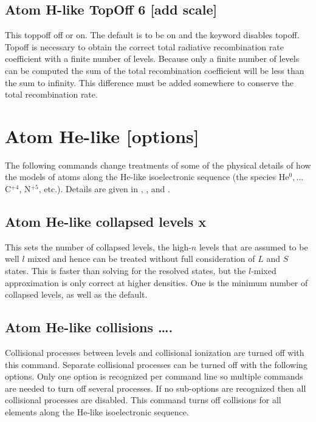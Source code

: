 \subsection{Atom H-like TopOff 6 [add scale]}

This toppoff off or on.
The default is to be on and the keyword  disables topoff.
Topoff is necessary to obtain the correct total
radiative recombination rate coefficient with a finite number of levels.
Because only a finite number of levels can be computed the sum
of the total
recombination coefficient will be less than the sum to infinity.
This difference must be added somewhere to conserve the
total recombination rate.

\section{Atom He-like [options]}

The following commands change treatments of some of the physical details
of how the models of atoms along the He-like isoelectronic sequence (the
species He$^0,\dots$ C$^{+4}$, N$^{+5}$, etc.).
Details are given in \citet{Bauman2005},
\citet{Porter2005}, and \citet{PorterFerlandMacAdam2007}.

\subsection{Atom He-like collapsed levels x}

This sets the number of collapsed levels, the high-$n$ levels that are
assumed to be well $l$ mixed and hence can be treated without full
consideration of $L$ and $S$ states.  This is faster than solving for the
resolved states, but the $l$-mixed approximation is only correct at higher
densities.  One is the minimum number of collapsed levels, as well as the
default.

\subsection{Atom He-like collisions \dots.}

Collisional processes between levels and collisional ionization are turned
off with this command.
Separate collisional processes can be turned off
with the following options.
Only one option is recognized per command line
so multiple commands are needed to turn off several processes.
If no
sub-options are recognized then all collisional processes are disabled.
This command turns off collisions for all elements along the He-like
isoelectronic sequence.

